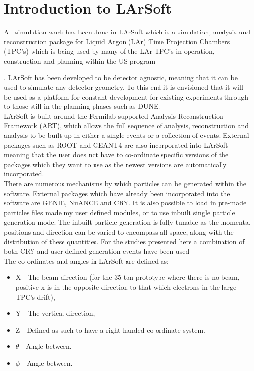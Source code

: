 \documentclass[11pt]{report} %
\begin{document}
\section{Introduction to LArSoft}
All simulation work has been done in LArSoft which is a simulation, analysis and reconstruction package for Liquid Argon (LAr) Time Projection Chambers (TPC's) which is being used by many of the LAr-TPC's in operation, construction and planning within the US program {\cite{Church_LArSoft}. LArSoft has been developed to be detector agnostic, meaning that it can be used to simulate any detector geometry. To this end it is envisioned that it will be used as a platform for constant development for existing experiments through to those still in the planning phases such as DUNE. \\ 

LArSoft is built around the Fermilab-supported Analysis Reconstruction Framework (ART), which allows the full sequence of analysis, reconstruction and analysis to be built up in either a single events or a collection of events. External packages such as ROOT and GEANT4 are also incorporated into LArSoft meaning that the user does not have to co-ordinate specific versions of the packages which they want to use as the newest versions are automatically incorporated. \\

There are numerous mechanisms by which particles can be generated within the software. External packages which have already been incorporated into the software are GENIE, NuANCE and CRY. It is also possible to load in pre-made particles files made my user defined modules, or to use inbuilt single particle generation mode. The inbuilt particle generation is fully tunable as the momenta, positions and direction can be varied to encompass all space, along with the distribution of these quantities. For the studies presented here a combination of both CRY and user defined generation events have been used.\\

The co-ordinates and angles in LArSoft are defined as; 
\begin{itemize}
\item X - The beam direction (for the 35 ton prototype where there is no beam, positive x is in the opposite direction to that which electrons in the large TPC's drift), 
\item Y - The vertical direction, 
\item Z - Defined as such to have a right handed co-ordinate system.
\item $\theta$ - Angle between.
\item $\phi$ - Angle between.
\end{itemize}

}
\end{document}
